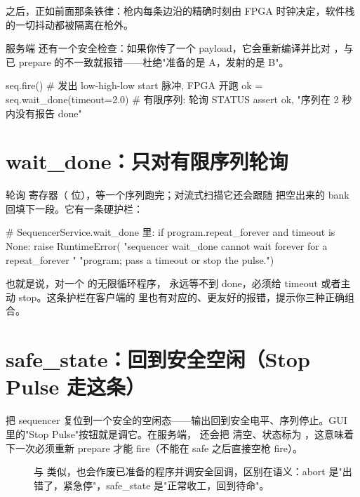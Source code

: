 \documentclass[11pt,oneside,openany]{book}
\begin{document}
 之后，正如前面那条铁律：枪内每条边沿的精确时刻由 FPGA 时钟决定，软件栈的一切抖动都被隔离在枪外。

服务端  还有一个安全检查：如果你传了一个 payload，它会重新编译并比对 ，与已 prepare 的不一致就报错——杜绝"准备的是 A，发射的是 B"。

\begin{codeblock}[Python]
seq.fire()                 # 发出 low-high-low start 脉冲, FPGA 开跑
ok = seq.wait_done(timeout=2.0)   # 有限序列: 轮询 STATUS
assert ok, "序列在 2 秒内没有报告 done"
\end{codeblock}

\section{wait\_done：只对有限序列轮询}

 轮询  寄存器（ 位），等一个序列跑完；对流式扫描它还会跟随  把空出来的 bank 回填下一段。它有一条硬护栏：

\begin{codeblock}[Python]
# SequencerService.wait_done 里:
if program.repeat_forever and timeout is None:
    raise RuntimeError(
        "sequencer wait_done cannot wait forever for a repeat_forever "
        "program; pass a timeout or stop the pulse.")
\end{codeblock}

也就是说，对一个  的无限循环程序， 永远等不到 done，必须给 timeout 或者主动 stop。这条护栏在客户端的  里也有对应的、更友好的报错，提示你三种正确组合。

\section{safe\_state：回到安全空闲（Stop Pulse 走这条）}

 把 sequencer 复位到一个安全的空闲态——输出回到安全电平、序列停止。GUI 里的"Stop Pulse"按钮就是调它。在服务端， 还会把  清空、状态标为 ，这意味着下一次必须重新 prepare 才能 fire（不能在 safe 之后直接空枪 fire）。

\begin{description}
\item[] 与  类似，也会作废已准备的程序并调安全回调，区别在语义：abort 是"出错了，紧急停"，safe\_state 是"正常收工，回到待命"。
\end{description}
\end{document}
